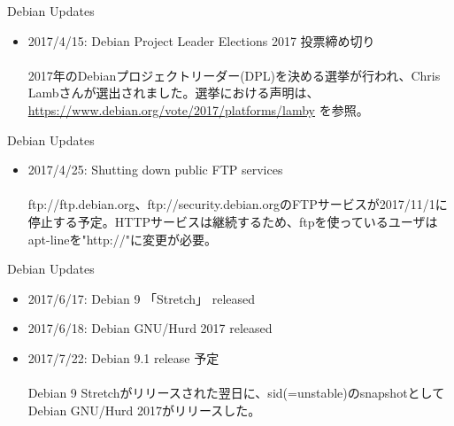\begin{frame}{Debian Updates}%

\begin{itemize}[<+->]
\item 2017/4/15:  Debian Project Leader Elections 2017 投票締め切り\\
\ \\
   \small{2017年のDebianプロジェクトリーダー(DPL)を決める選挙が行われ、Chris Lambさんが選出されました。選挙における声明は、\url{https://www.debian.org/vote/2017/platforms/lamby} を参照。}

\end{itemize}

\end{frame}


\begin{frame}{Debian Updates}%

\begin{itemize}[<+->]
\item 2017/4/25:  Shutting down public FTP services\\
\ \\
\small{ftp://ftp.debian.org、ftp://security.debian.orgのFTPサービスが2017/11/1に停止する予定。HTTPサービスは継続するため、ftpを使っているユーザはapt-lineを"http://"に変更が必要。}

\end{itemize}

\end{frame}


\begin{frame}{Debian Updates}%

\begin{itemize}[<+->]
\item 2017/6/17:  Debian 9 「Stretch」 released\\
\item 2017/6/18:  Debian GNU/Hurd 2017 released\\
\item 2017/7/22:  Debian 9.1 release 予定\\
\ \\
  \small{Debian 9 Stretchがリリースされた翌日に、sid(=unstable)のsnapshotとしてDebian GNU/Hurd 2017がリリースした。}

\end{itemize}

\end{frame}


